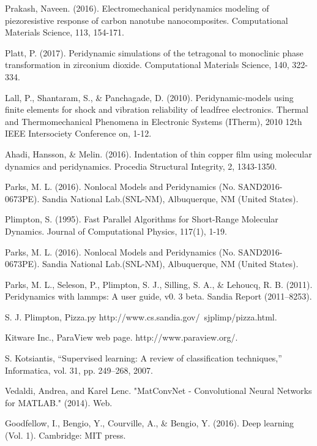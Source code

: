 \begin{thebibliography}{}
Prakash, Naveen. (2016). Electromechanical peridynamics modeling of piezoresistive response of carbon nanotube nanocomposites. Computational Materials Science, 113, 154-171.

Platt, P. (2017). Peridynamic simulations of the tetragonal to monoclinic phase transformation in zirconium dioxide. Computational Materials Science, 140, 322-334.

Lall, P., Shantaram, S., \& Panchagade, D. (2010). Peridynamic-models using finite elements for shock and vibration reliability of leadfree electronics. Thermal and Thermomechanical Phenomena in Electronic Systems (ITherm), 2010 12th IEEE Intersociety Conference on, 1-12.

Ahadi, Hansson, \& Melin. (2016). Indentation of thin copper film using molecular dynamics and peridynamics. Procedia Structural Integrity, 2, 1343-1350.

Parks, M. L. (2016). Nonlocal Models and Peridynamics (No. SAND2016-0673PE). Sandia National Lab.(SNL-NM), Albuquerque, NM (United States).

Plimpton, S. (1995). Fast Parallel Algorithms for Short-Range Molecular Dynamics. Journal of Computational Physics, 117(1), 1-19.

Parks, M. L. (2016). Nonlocal Models and Peridynamics (No. SAND2016-0673PE). Sandia National Lab.(SNL-NM), Albuquerque, NM (United States).

Parks, M. L., Seleson, P., Plimpton, S. J., Silling, S. A., \& Lehoucq, R. B. (2011). Peridynamics with lammps: A user guide, v0. 3 beta. Sandia Report (2011–8253).

S. J. Plimpton, Pizza.py http://www.cs.sandia.gov/~sjplimp/pizza.html.

Kitware Inc., ParaView web page. http://www.paraview.org/.


S. Kotsiantis, “Supervised learning: A review of classification techniques,” Informatica, vol. 31, pp. 249–268, 2007.

Vedaldi, Andrea, and Karel Lenc. "MatConvNet - Convolutional Neural Networks for MATLAB." (2014). Web.

Goodfellow, I., Bengio, Y., Courville, A., \& Bengio, Y. (2016). Deep learning (Vol. 1). Cambridge: MIT press.


\end{thebibliography}

